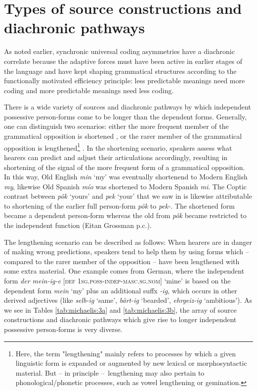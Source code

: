 \documentclass[output=paper]{langsci/langscibook}
\begin{document}
\section{Types of source constructions and diachronic pathways}

As noted earlier, synchronic universal coding asymmetries have a diachronic correlate because the adaptive forces must have been active in earlier stages of the language and have kept shaping grammatical structures according to the functionally motivated efficiency principle: less predictable meanings need more coding and more predictable meanings need less coding.

There is a wide variety of sources and diachronic pathways by which independent possessive person-forms come to be longer than the dependent forms. Generally, one can distinguish two scenarios: either the more frequent member of the grammatical opposition is shortened \citep{Bybee2007}, or the rarer member of the grammatical opposition is lengthened\footnote{Here, the term "lengthening" mainly refers to processes by which a given linguistic form is expanded or augmented by new lexical or morphosyntactic material. But – in principle –~lengthening may also pertain to phonological/phonetic processes, such as vowel lengthening or gemination.} \citep{Haspelmath2008}. In the shortening scenario, speakers assess what hearers can predict and adjust their articulations accordingly, resulting in shortening of the signal of the more frequent form of a grammatical opposition. In this way, Old English \textit{min} `my' was eventually shortenend to Modern English \textit{my}, likewise Old Spanish \textit{mío} was shortened to Modern Spanish \textit{mi}. The Coptic contrast between \textit{pôk} `yours' and \textit{pek} `your' that we saw in  is likewise attributable to shortening of the earlier full person-form \textit{pôk} to \textit{pek-}. The shortened form became a dependent person-form whereas the old from \textit{pôk} became restricted to the independent function (Eitan Grossman p.c.).

The lengthening scenario can be described as follows: When hearers are in danger of making wrong predictions, speakers tend to help them by using forms which – compared to the rarer member of the opposition – have been lengthened with some extra material. One example comes from German, where the independent form \textit{der mein-ig-e} [\textsc{def} \textsc{1sg.poss-indep-masc.sg.nom}] ‘mine’ is based on the dependent form \textit{mein} `my' plus an additional suffx \textit{{}-ig,} which occurs in other derived adjectives (like \textit{selb-ig} `same', \textit{bärt-ig} `bearded', \textit{ehrgeiz-ig} `ambitious'). As we see in Tables \ref{tab:michaelis:3a} and \ref{tab:michaelis:3b}, the array of source constructions and diachronic pathways which give rise to longer independent possessive person-forms is very diverse.
\end{document}

